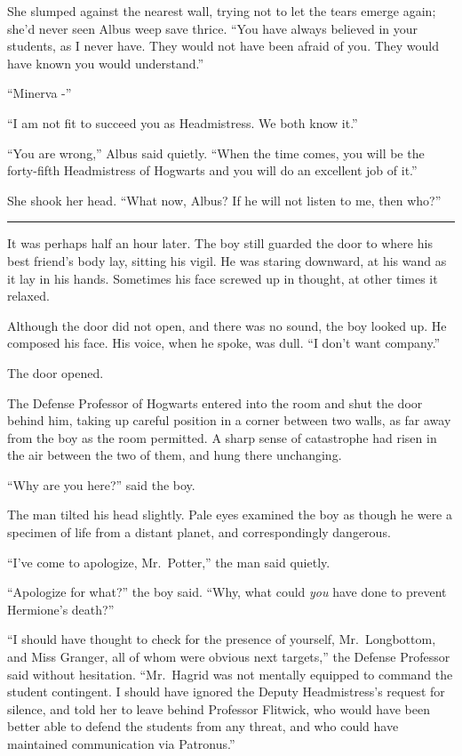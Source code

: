 She slumped against the nearest wall, trying not to let the tears emerge
again; she'd never seen Albus weep save thrice. ``You have always
believed in your students, as I never have. They would not have been
afraid of you. They would have known you would understand.''

``Minerva -''

``I am not fit to succeed you as Headmistress. We both know it.''

``You are wrong,'' Albus said quietly. ``When the time comes, you will
be the forty-fifth Headmistress of Hogwarts and you will do an excellent
job of it.''

She shook her head. ``What now, Albus? If he will not listen to me, then
who?''

\begin{center}\rule{3in}{0.4pt}\end{center}

It was perhaps half an hour later. The boy still guarded the door to
where his best friend's body lay, sitting his vigil. He was staring
downward, at his wand as it lay in his hands. Sometimes his face screwed
up in thought, at other times it relaxed.

Although the door did not open, and there was no sound, the boy looked
up. He composed his face. His voice, when he spoke, was dull. ``I don't
want company.''

The door opened.

The Defense Professor of Hogwarts entered into the room and shut the
door behind him, taking up careful position in a corner between two
walls, as far away from the boy as the room permitted. A sharp sense of
catastrophe had risen in the air between the two of them, and hung there
unchanging.

``Why are you here?'' said the boy.

The man tilted his head slightly. Pale eyes examined the boy as though
he were a specimen of life from a distant planet, and correspondingly
dangerous.

``I've come to apologize, Mr.~Potter,'' the man said quietly.

``Apologize for what?'' the boy said. ``Why, what could \emph{you} have
done to prevent Hermione's death?''

``I should have thought to check for the presence of yourself,
Mr.~Longbottom, and Miss Granger, all of whom were obvious next
targets,'' the Defense Professor said without hesitation. ``Mr.~Hagrid
was not mentally equipped to command the student contingent. I should
have ignored the Deputy Headmistress's request for silence, and told her
to leave behind Professor Flitwick, who would have been better able to
defend the students from any threat, and who could have maintained
communication via Patronus.''

